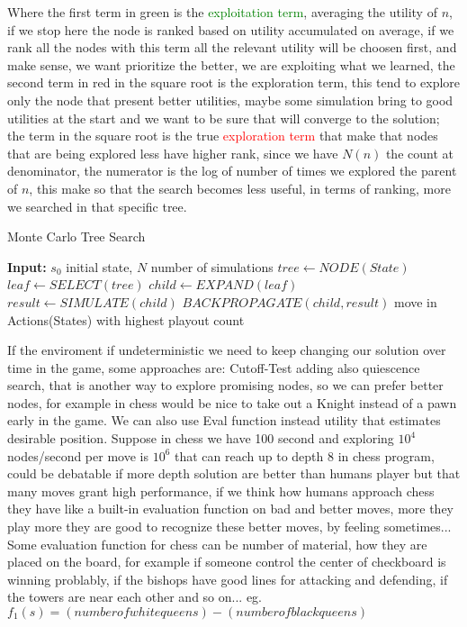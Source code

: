 \documentclass[12pt]{book}
\begin{document}
Where the first term in green is the \textcolor{green}{exploitation term}, averaging the utility of $n$, if we stop here the node is ranked based on utility accumulated on average, if we rank all the nodes with this term all the relevant utility will be choosen first, and make sense, we want prioritize the better, we are exploiting what we learned, the second term in red in the square root is the exploration term, this tend to explore only the node that present better utilities, maybe some simulation bring to good utilities at the start and we want to be sure that will converge to the solution; the term in the square root is the true \textcolor{red}{exploration term} that make that nodes that are being explored less have higher rank, since we have $N(n)$ the count at denominator, the numerator is the log of number of times we explored the parent of $n$, this make so that the search becomes less useful, in terms of ranking, more we searched in that specific tree.


\begin{algorithm}
\caption{Monte Carlo Tree Search}
\begin{algorithmic}[1]
\STATE \textbf{Input:} $s_0$ initial state, $N$ number of simulations
\STATE $tree \gets NODE(State)$
\STATE $leaf \gets SELECT(tree)$
\STATE $child \gets EXPAND(leaf)$
\STATE $result \gets SIMULATE(child)$
\STATE $BACKPROPAGATE(child,result)$
\ENDFOR
\RETURN move in Actions(States) with highest playout count 
\end{algorithmic}
\end{algorithm}
	
If the enviroment if undeterministic we need to keep changing our solution over time in the game, some approaches are: Cutoff-Test adding also quiescence search, that is another way to explore promising nodes, so we can prefer better nodes, for example in chess would be nice to take out a Knight instead of a pawn early in the game. We can also use Eval function instead utility that estimates desirable position.\newline
Suppose in chess we have 100 second and exploring $10^4$ nodes/second per move is $10^6$ that can reach up to depth 8 in chess program, could be debatable if more depth solution are better than humans player but that many moves grant high performance, if we think how humans approach chess they have like a built-in evaluation function on bad and better moves, more they play more they are good to recognize these better moves, by feeling sometimes...\newline
Some evaluation function for chess can be number of material, how they are placed on the board, for example if someone control the center of checkboard is winning problably, if the bishops have good lines for attacking and defending, if the towers are near each other and so on...
eg. $f_1(s) = (number of white queens) - (number of black queens)$  
\end{document}
